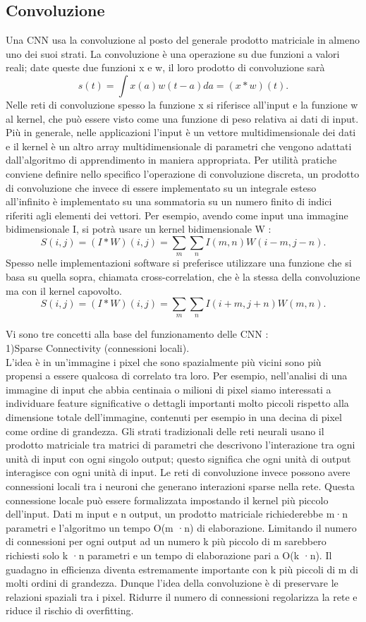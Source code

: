 \subsection{Convoluzione}
Una CNN usa la convoluzione al posto del generale prodotto matriciale in 
almeno uno dei suoi strati. 
La convoluzione è una operazione su due funzioni a valori reali; 
date queste due funzioni x e w, il loro prodotto di convoluzione sarà
\[s(t) = \int x(a)w(t-a) da = (x * w) (t).\]
Nelle reti di convoluzione spesso la funzione x si riferisce
 all’input e la funzione w al kernel, che può essere visto come una funzione
  di peso relativa ai dati di input. Più in generale, nelle applicazioni l’input 
  è un vettore multidimensionale dei dati e il kernel è un altro array 
  multidimensionale di parametri che vengono adattati dall’algoritmo di
   apprendimento in maniera appropriata. Per utilità pratiche conviene 
   definire nello specifico l’operazione di convoluzione discreta, 
   un prodotto di convoluzione che invece di essere implementato su un integrale
    esteso all’infinito è implementato su una sommatoria su un numero finito di 
    indici riferiti agli elementi dei vettori. Per esempio, avendo come input
     una immagine bidimensionale I, si potrà usare un kernel bidimensionale W :
\[S(i, j) = ( I * W )(i, j) = \sum_{m}\sum_{n} I(m, n)W(i-m, j-n).\]
Spesso nelle implementazioni software si preferisce utilizzare una funzione che si basa su quella sopra,
 chiamata cross-correlation, che è la stessa della convoluzione ma con
  il kernel capovolto. 
  \[S(i, j) = ( I * W )(i, j) = \sum_{m}\sum_{n} I(i+m, j+n)W(m, n).\]

Vi sono tre concetti alla base del funzionamento delle CNN :\\
1)Sparse Connectivity (connessioni locali).\\
L’idea è in un’immagine i pixel che sono spazialmente più vicini sono più propensi a essere qualcosa di correlato tra loro. 
Per esempio, nell’analisi di una immagine di input che abbia centinaia o milioni di pixel siamo interessati a individuare feature significative o dettagli importanti molto piccoli rispetto alla dimensione totale dell’immagine, contenuti per esempio in una decina di pixel come ordine di grandezza.
Gli strati tradizionali delle reti neurali usano il prodotto matriciale tra matrici di parametri che descrivono l’interazione tra ogni unità di input con ogni singolo output; questo significa che ogni unità di output interagisce con ogni unità di input. Le reti di convoluzione invece possono avere connessioni locali tra i neuroni che generano interazioni sparse nella rete. Questa connessione locale può essere formalizzata impostando il kernel più piccolo dell’input. 
Dati m input e n output, un prodotto matriciale richiederebbe m·n parametri e l’algoritmo un tempo O(m ·n) di elaborazione. Limitando il numero di connessioni per ogni output ad un numero k più piccolo di m sarebbero richiesti solo k ·n parametri e un tempo di elaborazione pari a O(k ·n). Il guadagno in efficienza diventa estremamente importante con k più piccoli di m di molti ordini di grandezza. Dunque l’idea della convoluzione è di preservare le relazioni spaziali tra i pixel. 
Ridurre il numero di connessioni regolarizza la rete e riduce il rischio di overfitting. 

